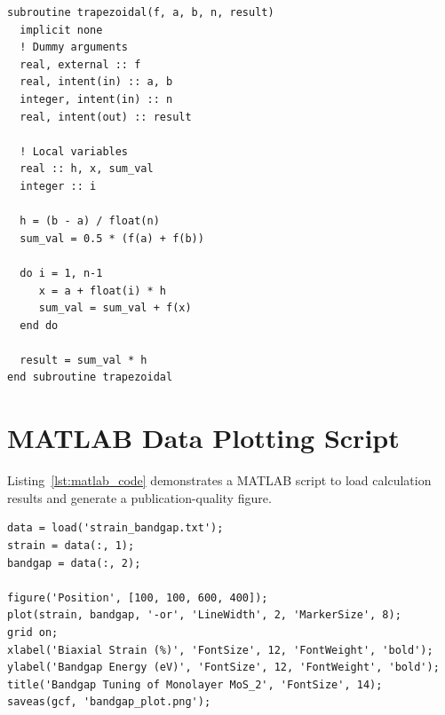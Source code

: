 \begin{lstlisting}[style=fortranstyle, caption={Fortran 95 implementation of the trapezoidal rule.}, label={lst:fortran_code}]
subroutine trapezoidal(f, a, b, n, result)
  implicit none
  ! Dummy arguments
  real, external :: f
  real, intent(in) :: a, b
  integer, intent(in) :: n
  real, intent(out) :: result
  
  ! Local variables
  real :: h, x, sum_val
  integer :: i
  
  h = (b - a) / float(n)
  sum_val = 0.5 * (f(a) + f(b))
  
  do i = 1, n-1
     x = a + float(i) * h
     sum_val = sum_val + f(x)
  end do
  
  result = sum_val * h
end subroutine trapezoidal
\end{lstlisting}

\section{MATLAB Data Plotting Script}
Listing~\ref{lst:matlab_code} demonstrates a MATLAB script to load calculation results and generate a publication-quality figure.

\begin{lstlisting}[style=matlabstyle, caption={MATLAB script to plot strained bandgaps.}, label={lst:matlab_code}]
% MATLAB script to plot bandgap vs strain
data = load('strain_bandgap.txt');
strain = data(:, 1);
bandgap = data(:, 2);

figure('Position', [100, 100, 600, 400]);
plot(strain, bandgap, '-or', 'LineWidth', 2, 'MarkerSize', 8);
grid on;
xlabel('Biaxial Strain (%)', 'FontSize', 12, 'FontWeight', 'bold');
ylabel('Bandgap Energy (eV)', 'FontSize', 12, 'FontWeight', 'bold');
title('Bandgap Tuning of Monolayer MoS_2', 'FontSize', 14);
saveas(gcf, 'bandgap_plot.png');
\end{lstlisting}
